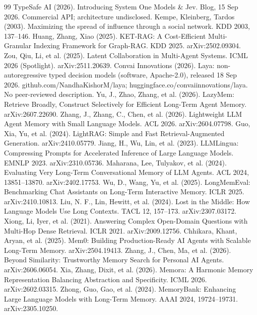 \documentclass[11pt]{article}
\begin{document}
\begin{thebibliography}{99}
 TypeSafe AI (2026). Introducing System One Models \& Jev. Blog, 15 Sep 2026. Commercial API; architecture undisclosed.
 Kempe, Kleinberg, Tardos (2003). Maximizing the spread of influence through a social network. KDD 2003, 137--146.
 Huang, Zhang, Xiao (2025). KET-RAG: A Cost-Efficient Multi-Granular Indexing Framework for Graph-RAG. KDD 2025. arXiv:2502.09304.
 Zou, Qiu, Li, et al. (2025). Latent Collaboration in Multi-Agent Systems. ICML 2026 (Spotlight). arXiv:2511.20639.
 Convai Innovations (2026). Laya: non-autoregressive typed decision models (software, Apache-2.0), released 18 Sep 2026. github.com/NandhaKishorM/laya; huggingface.co/convaiinnovations/laya. No peer-reviewed description.
 Yu, J., Zhao, Zhang, et al. (2026). LazyMem: Retrieve Broadly, Construct Selectively for Efficient Long-Term Agent Memory. arXiv:2607.22690.
 Zhang, J., Zhang, C., Chen, et al. (2026). Lightweight LLM Agent Memory with Small Language Models. ACL 2026. arXiv:2604.07798.
 Guo, Xia, Yu, et al. (2024). LightRAG: Simple and Fast Retrieval-Augmented Generation. arXiv:2410.05779.
 Jiang, H., Wu, Lin, et al. (2023). LLMLingua: Compressing Prompts for Accelerated Inference of Large Language Models. EMNLP 2023. arXiv:2310.05736.
 Maharana, Lee, Tulyakov, et al. (2024). Evaluating Very Long-Term Conversational Memory of LLM Agents. ACL 2024, 13851--13870. arXiv:2402.17753.
 Wu, D., Wang, Yu, et al. (2025). LongMemEval: Benchmarking Chat Assistants on Long-Term Interactive Memory. ICLR 2025. arXiv:2410.10813.
 Liu, N. F., Lin, Hewitt, et al. (2024). Lost in the Middle: How Language Models Use Long Contexts. TACL 12, 157--173. arXiv:2307.03172.
 Xiong, Li, Iyer, et al. (2021). Answering Complex Open-Domain Questions with Multi-Hop Dense Retrieval. ICLR 2021. arXiv:2009.12756.
 Chhikara, Khant, Aryan, et al. (2025). Mem0: Building Production-Ready AI Agents with Scalable Long-Term Memory. arXiv:2504.19413.
 Zhang, J., Chen, Ma, et al. (2026). Beyond Similarity: Trustworthy Memory Search for Personal AI Agents. arXiv:2606.06054.
 Xia, Zhang, Dixit, et al. (2026). Memora: A Harmonic Memory Representation Balancing Abstraction and Specificity. ICML 2026. arXiv:2602.03315.
 Zhong, Guo, Gao, et al. (2024). MemoryBank: Enhancing Large Language Models with Long-Term Memory. AAAI 2024, 19724--19731. arXiv:2305.10250.

\end{thebibliography}
\end{document}
